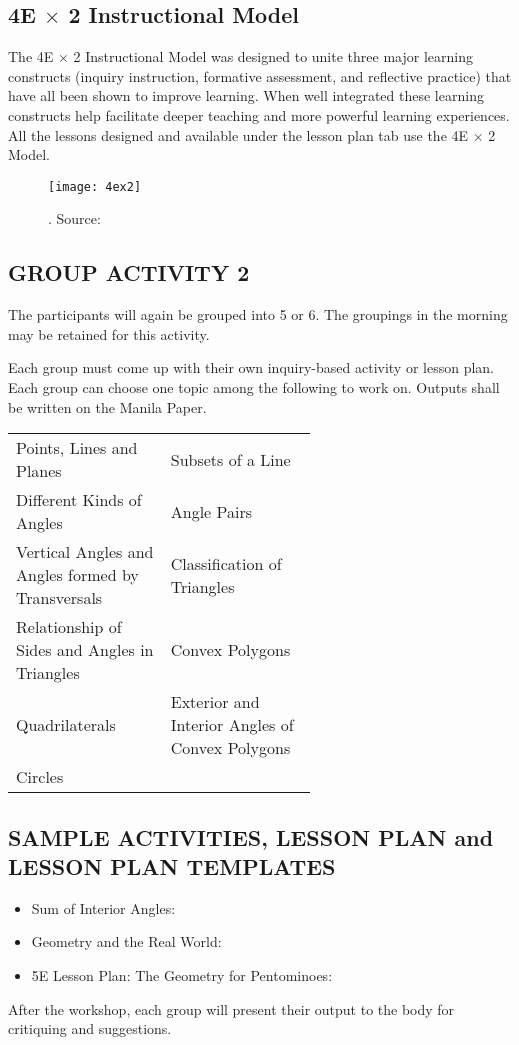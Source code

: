 \subsection*{4E $\times$ 2 Instructional Model}
The 4E $\times$ 2 Instructional Model
was designed to unite three major
learning constructs (inquiry instruction,
formative assessment, and reflective
practice) that have all been shown to
improve learning. When well integrated
these learning constructs help facilitate
deeper teaching and more powerful
learning experiences. All the lessons
designed and available under the lesson
plan tab use the 4E $\times$ 2 Model.
\begin{figure}[!h]
\centering
\texttt{[image: 4ex2]}
\caption{. Source: }
\label{chap8fig:6}
\end{figure}
\subsection*{GROUP ACTIVITY 2}
The participants will again be grouped into 5 or 6. The groupings in the morning may be
retained for this activity.

Each group must come up with their own inquiry-based activity or lesson plan. Each group can
choose one topic among the following to work on. Outputs shall be written on the Manila Paper.

\begin{center}
\begin{tabular}{p{0.3\linewidth}p{0.3\linewidth}}
\hline 
Points, Lines and Planes & Subsets of a Line\\
Different Kinds of Angles & Angle Pairs\\
Vertical Angles and Angles formed by Transversals & Classification of Triangles\\
Relationship of Sides and Angles in Triangles & Convex Polygons\\
Quadrilaterals & Exterior and Interior Angles of Convex Polygons\\
Circles & \\
\hline 
\end{tabular}
\end{center}
\subsection*{SAMPLE ACTIVITIES, LESSON PLAN and LESSON PLAN TEMPLATES}
\begin{itemize}
\item Sum of Interior Angles: 
\item Geometry and the Real World: 
\item 5E Lesson Plan: The Geometry for Pentominoes: 
\end{itemize}
After the workshop, each group will present their output to the body for critiquing
and suggestions.
